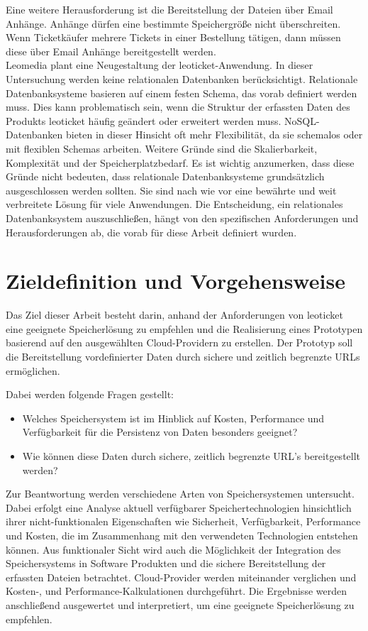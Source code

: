 Eine weitere Herausforderung ist die Bereitstellung der Dateien über Email Anhänge. Anhänge dürfen eine bestimmte Speichergröße nicht überschreiten. Wenn Ticketkäufer mehrere Tickets in einer Bestellung tätigen, dann müssen diese über Email Anhänge bereitgestellt werden.\\

Leomedia plant eine Neugestaltung der leoticket-Anwendung. In dieser Untersuchung werden keine relationalen Datenbanken berücksichtigt. Relationale Datenbanksysteme basieren auf einem festen Schema, das vorab definiert werden muss. Dies kann problematisch sein, wenn die Struktur der erfassten Daten des Produkts leoticket häufig geändert oder erweitert werden muss. NoSQL-Datenbanken bieten in dieser Hinsicht oft mehr Flexibilität, da sie schemalos oder mit flexiblen Schemas arbeiten. Weitere Gründe sind die Skalierbarkeit, Komplexität und der Speicherplatzbedarf. Es ist wichtig anzumerken, dass diese Gründe nicht bedeuten, dass relationale Datenbanksysteme grundsätzlich ausgeschlossen werden sollten. Sie sind nach wie vor eine bewährte und weit verbreitete Lösung für viele Anwendungen. Die Entscheidung, ein relationales Datenbanksystem auszuschließen, hängt von den spezifischen Anforderungen und Herausforderungen ab, die vorab für diese Arbeit definiert wurden.

\newpage

\section{Zieldefinition und Vorgehensweise}

Das Ziel dieser Arbeit besteht darin, anhand der Anforderungen von leoticket eine geeignete Speicherlösung zu empfehlen und die Realisierung eines Prototypen basierend auf den ausgewählten Cloud-Providern zu erstellen. Der Prototyp soll die Bereitstellung vordefinierter Daten durch sichere und zeitlich begrenzte URLs ermöglichen. 

Dabei werden folgende Fragen gestellt:

\begin{itemize}
	\item Welches Speichersystem ist im Hinblick auf Kosten, Performance und Verfügbarkeit für die Persistenz von Daten besonders geeignet? 
	\item Wie können diese Daten durch sichere, zeitlich begrenzte URL's bereitgestellt werden?
\end{itemize}

Zur Beantwortung werden verschiedene Arten von Speichersystemen untersucht. Dabei erfolgt eine Analyse  aktuell verfügbarer Speichertechnologien hinsichtlich ihrer nicht-funktionalen Eigenschaften wie Sicherheit, Verfügbarkeit, Performance und Kosten, die im Zusammenhang mit den verwendeten Technologien entstehen können. Aus funktionaler Sicht wird auch die Möglichkeit der Integration des Speichersystems in Software Produkten und die sichere Bereitstellung der erfassten Dateien betrachtet. Cloud-Provider werden miteinander verglichen und Kosten-, und Performance-Kalkulationen durchgeführt. Die Ergebnisse werden anschließend ausgewertet und interpretiert, um eine geeignete Speicherlösung zu empfehlen.\\

